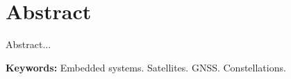 %
%
%
%
%

%
%
%
%
%

\chapter*{Abstract}

{\parindent0pt
Abstract...
}

\smallskip
\noindent \textbf{Keywords:} Embedded systems. Satellites. GNSS. Constellations.
